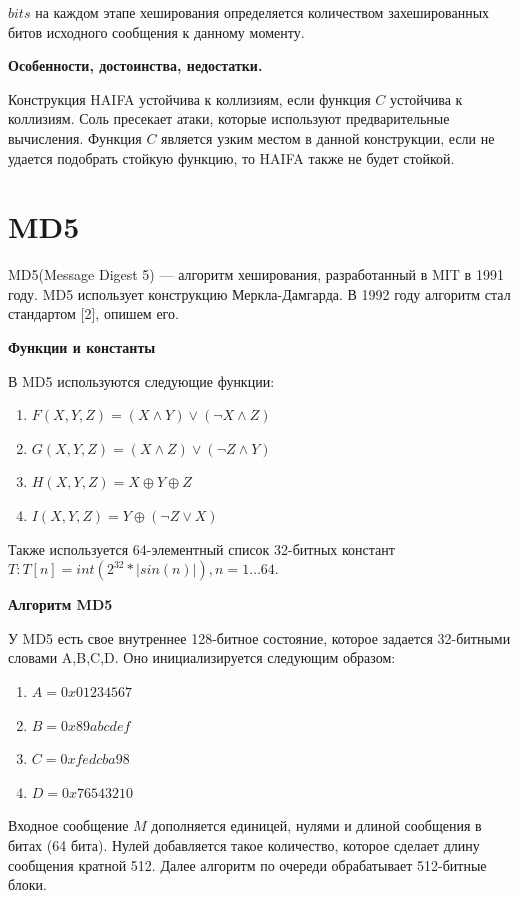 \documentclass[colorthm]{./civarticle}
\begin{document}
$bits$ на каждом этапе хеширования определяется количеством захешированных битов исходного сообщения к данному моменту.

\textbf{Особенности, достоинства, недостатки.}

Конструкция HAIFA устойчива к коллизиям, если функция $C$ устойчива к коллизиям. Соль пресекает атаки, которые используют предварительные вычисления. Функция $C$ является узким местом в данной конструкции, если не удается подобрать стойкую функцию, то HAIFA также не будет стойкой.

\section{MD5}

MD5(Message Digest 5) — алгоритм хеширования, разработанный в MIT в 1991 году. MD5 использует конструкцию Меркла-Дамгарда. В 1992 году алгоритм стал стандартом [2], опишем его.

\textbf{Функции и константы}

В MD5 используются следующие функции:

\begin{enumerate}
    \item $F(X, Y, Z)=(X \wedge Y) \vee(\neg X \wedge Z)$
    \item $G(X, Y, Z)=(X \wedge Z) \vee(\neg Z \wedge Y)$
    \item $H(X, Y, Z)=X \oplus Y \oplus Z$
    \item $I(X, Y, Z)=Y \oplus(\neg Z \vee X)$
\end{enumerate}

Также используется 64-элементный список 32-битных констант $T: T[n] = int(2^{32} * |sin(n)|), n = 1 \dots 64$.

\textbf{Алгоритм MD5}

У MD5 есть свое внутреннее 128-битное состояние, которое задается 32-битными словами A,B,C,D. Оно инициализируется следующим образом:

\begin{enumerate}
    \item $A = 0x 01 23 45 67$
    \item $B = 0x 89 ab cd ef$
    \item $C = 0x fe dc ba 98$
    \item $D = 0x 76 54 32 10$
\end{enumerate}

Входное сообщение $M$ дополняется единицей, нулями и длиной сообщения в битах (64 бита). Нулей добавляется такое количество, которое сделает длину сообщения кратной 512. Далее алгоритм по очереди обрабатывает 512-битные блоки.
\end{document}
